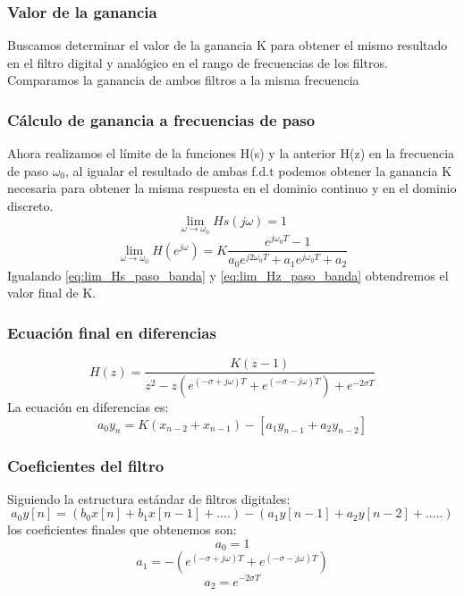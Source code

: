 \documentclass[titlepage]{article}
\begin{document}
\subsubsection{Valor de la ganancia}
Buscamos determinar el valor de la ganancia K para obtener el mismo resultado en el filtro digital y analógico en el rango de frecuencias de los filtros. Comparamos la ganancia de ambos filtros a la misma frecuencia 
\subsubsection{Cálculo de ganancia a frecuencias de paso}
Ahora realizamos el límite de la funciones H(s) y la anterior H(z) en la frecuencia de paso $\omega_0$, al igualar el resultado de ambas f.d.t podemos obtener la ganancia K necesaria para obtener la misma respuesta en el dominio continuo y en el dominio discreto.
\begin{equation}
\label{eq:lim_Hs_paso_banda}\lim_{\omega \to \omega_0}Hs(j\omega)=1
\end{equation}
\begin{equation}
\label{eq:lim_Hz_paso_banda}\lim_{\omega \to \omega_0}H(e^{j\omega})=K\frac{e^{j\omega_0T}-1}{a_0e^{j2\omega_0T}+a_1e^{j\omega_0T}+a_2}
\end{equation}
Igualando \ref{eq:lim_Hs_paso_banda} y \ref{eq:lim_Hz_paso_banda} obtendremos el valor final de K.
\subsubsection{Ecuación final en diferencias}
\begin{equation}
H(z)=\frac{K(z-1)}{z^2-z(e^{(-\sigma+j\omega)T}+e^{(-\sigma-j\omega)T}) + e^{-2{\sigma}T}}
\end{equation}
La ecuación en diferencias es:
\begin{equation}
a_0y_n=K(x_{n-2}+x_{n-1})-[a_1y_{n-1} + a_2y_{n-2}]
\end{equation}

\subsubsection{Coeficientes del filtro}
Siguiendo la estructura estándar de filtros digitales:
\begin{equation}
a_0y[n]=(b_0x[n]+b_1x[n-1]+ ....)-(a_1y[n-1] + a_2y[n-2] + .....)  
\end{equation}
los coeficientes finales que obtenemos son:
\begin{equation}
a_0=1
\end{equation}
\begin{equation}
a_1=-(e^{(-\sigma+j\omega)T}+e^{(-\sigma-j\omega)T})
\end{equation}
\begin{equation}
a_2=e^{-2{\sigma}T}
\end{equation}
\end{document}

